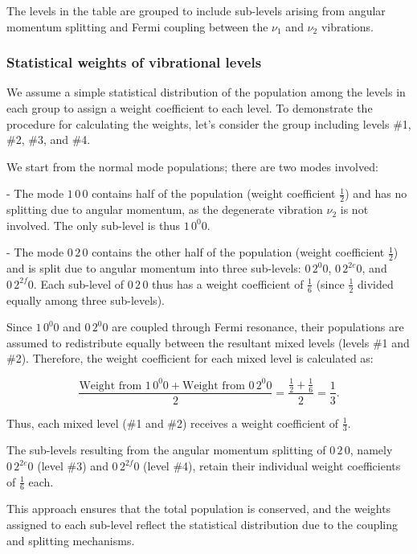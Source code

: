 \documentclass{report}
\begin{document}
The levels in the table are grouped to include sub-levels arising from angular momentum splitting and Fermi coupling between the $\nu_1$ and $\nu_2$ vibrations.


\subsubsection{Statistical weights of vibrational levels}

We assume a simple statistical distribution of the population among the levels in each group to assign a weight coefficient to each level. To demonstrate the procedure for calculating the weights, let's consider the group including levels \#1, \#2, \#3, and \#4.

We start from the normal mode populations; there are two modes involved:

- The mode $1\,0\,0$ contains half of the population (weight coefficient $\frac{1}{2}$) and has no splitting due to angular momentum, as the degenerate vibration $\nu_2$ is not involved. The only sub-level is thus $1\,0^{0}0$.

- The mode $0\,2\,0$ contains the other half of the population (weight coefficient $\frac{1}{2}$) and is split due to angular momentum into three sub-levels: $0\,2^{0}0$, $0\,2^{2e}0$, and $0\,2^{2f}0$. Each sub-level of $0\,2\,0$ thus has a weight coefficient of $\frac{1}{6}$ (since $\frac{1}{2}$ divided equally among three sub-levels).

Since $1\,0^{0}0$ and $0\,2^{0}0$ are coupled through Fermi resonance, their populations are assumed to redistribute equally between the resultant mixed levels (levels \#1 and \#2). Therefore, the weight coefficient for each mixed level is calculated as:

\[
\frac{ \text{Weight from } 1\,0^{0}0 + \text{Weight from } 0\,2^{0}0 }{2} = \frac{ \frac{1}{2} + \frac{1}{6} }{2} = \frac{1}{3}.
\]

Thus, each mixed level (\#1 and \#2) receives a weight coefficient of $\frac{1}{3}$.

The sub-levels resulting from the angular momentum splitting of $0\,2\,0$, namely $0\,2^{2e}0$ (level \#3) and $0\,2^{2f}0$ (level \#4), retain their individual weight coefficients of $\frac{1}{6}$ each.

This approach ensures that the total population is conserved, and the weights assigned to each sub-level reflect the statistical distribution due to the coupling and splitting mechanisms.
\end{document}
